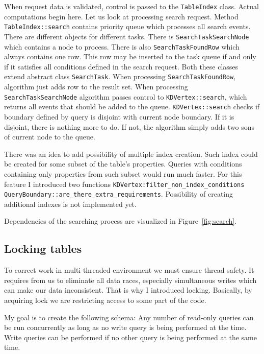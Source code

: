 \documentclass[10pt,a4paper]{article}
\begin{document}
When request data is validated, control is passed to the \verb|TableIndex| class. Actual computations begin here. Let us look at processing search request. Method \verb|TableIndex::search| contains priority queue which processes all search events. There are different objects for different tasks. There is \verb|SearchTaskSearchNode| which contains a node to process. There is also \verb|SearchTaskFoundRow| which always contains one row. This row may be inserted to the task queue if and only if it satisfies all conditions defined in the search request. Both these classes extend abstract class \verb|SearchTask|. When processing \verb|SearchTaskFoundRow|, algorithm just adds row to the result set. When processing \verb|SearchTaskSearchNode| algorithm passes control to \verb|KDVertex::search|, which returns all events that should be added to the queue. \verb|KDVertex::search| checks if boundary defined by query is disjoint with current node boundary. If it is disjoint, there is nothing more to do. If not, the algorithm simply adds two sons of current node to the queue.

There was an idea to add possibility of multiple index creation. Such index could be created for some subset of the table's properties. Queries with conditions containing only properties from such subset would run much faster. For this feature I introduced two functions \verb|KDVertex:filter_non_index_conditions| \verb|QueryBoundary::are_there_extra_requirements|. Possibility of creating additional indexes is not implemented yet.  

Dependencies of the searching process are visualized in Figure~\ref{fig:search}.

\subsection{Locking tables}

To correct work in multi-threaded environment we must ensure thread safety. It requires from us to eliminate all data races, especially simultaneous writes which can make our data inconsistent. That is why I introduced locking. Basically, by acquiring lock we are restricting access to some part of the code. 

My goal is to create the following schema: Any number of read-only queries can be run concurrently as long as no write query is being performed at the time. Write queries can be performed if no other query is being performed at the same time. 
\end{document}

